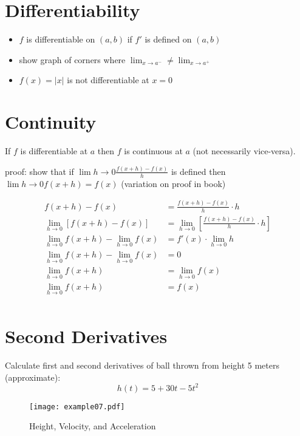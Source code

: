 \documentclass[letterpaper, landscape]{exam}
\begin{document}
  \section{Differentiability}

  \begin{itemize}
    \item $f$ is differentiable on $(a, b)$ if $f'$ is defined on $(a, b)$
    \item show graph of corners where $\lim_{x \to a^-} \neq \lim_{x \to a^+}$
    \item $f(x) = |x|$ is not differentiable at $x = 0$
  \end{itemize}

  \section{Continuity}
  If $f$ is differentiable at $a$ then $f$ is continuous at $a$ (not necessarily
  vice-versa).

  proof: show that if $\lim{h \to 0} \frac{f(x + h) - f(x)}{h}$ is defined then
  $\lim{h \to 0} f(x + h) = f(x)$ (variation on proof in book)

  \begin{align*}
    f(x + h) - f(x)                               & = \frac{f(x + h) - f(x)}{h} \cdot h \\
    \lim_{h \to 0} \left[ f(x + h) - f(x) \right] & = \lim_{h \to 0} \left[  \frac{f(x + h) - f(x)}{h} \cdot h \right] \\
    \lim_{h \to 0} f(x + h) - \lim_{h \to 0} f(x) & =  f'(x) \cdot \lim_{h \to 0} h  \\
    \lim_{h \to 0} f(x + h) - \lim_{h \to 0} f(x) & =  0 \\
    \lim_{h \to 0} f(x + h)                       & = \lim_{h \to 0} f(x) \\
    \lim_{h \to 0} f(x + h)                       & = f(x) \\
  \end{align*}

  \section{Second Derivatives}


  Calculate first and second derivatives of ball thrown from height 5 meters (approximate):
  \[
    h(t) = 5 + 30t - 5t^2
  \]

  \begin{figure}[H]
    \centering
    \texttt{[image: example07.pdf]}
    \caption{Height, Velocity, and Acceleration}
    \label{fig:example07}
  \end{figure}
\end{document}

